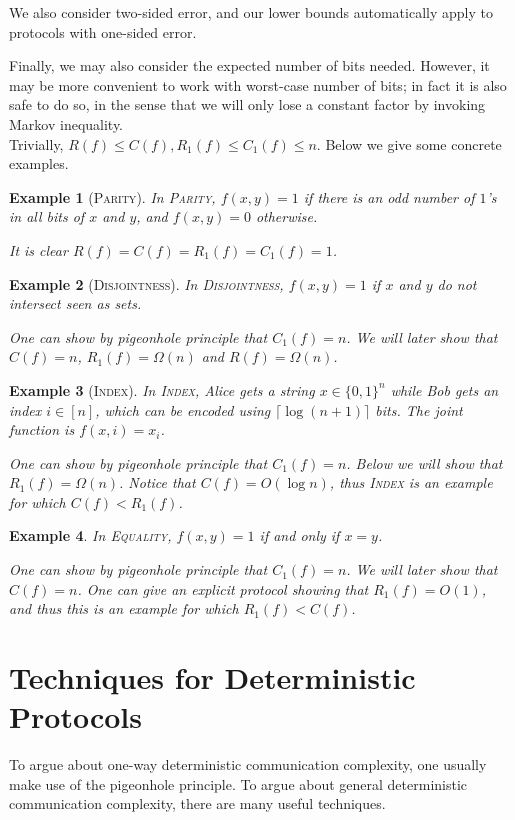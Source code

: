 \documentclass[openany]{book}
\newtheorem{example}{Example}[chapter]
\begin{document}
We also consider two-sided error, and our lower bounds automatically apply to protocols with one-sided error.

Finally, we may also consider the expected number of bits needed. However, it may be more convenient to work with worst-case number of bits; in fact it is also safe to do so, in the sense that we will only lose a constant factor by invoking Markov inequality. \\

Trivially, $R(f)\le C(f),R_1(f)\le C_1(f)\le n$. Below we give some concrete examples.
\begin{example}[\textsc{Parity}]
    In \textsc{Parity}, $f(x,y)=1$ if there is an odd number of $1$'s in all bits of $x$ and $y$, and $f(x,y)=0$ otherwise.

    It is clear $R(f)=C(f)=R_1(f)=C_1(f)=1$.
\end{example}
\begin{example}[\textsc{Disjointness}]
    In \textsc{Disjointness}, $f(x,y)=1$ if $x$ and $y$ do not intersect seen as sets.

    One can show by pigeonhole principle that $C_1(f)=n$. We will later show that $C(f)=n$, $R_1(f)=\Omega(n)$ and $R(f)=\Omega(n)$.
\end{example}
\begin{example}[\textsc{Index}]
    In \textsc{Index}, Alice gets a string $x\in\{0,1\}^n$ while Bob gets an index $i\in[n]$, which can be encoded using $\lceil\log(n+1)\rceil$ bits. The joint function is $f(x,i)=x_i$.

    One can show by pigeonhole principle that $C_1(f)=n$. Below we will show that $R_1(f)=\Omega(n)$. Notice that $C(f)=O(\log n)$, thus \textsc{Index} is an example for which $C(f)<R_1(f)$.
\end{example}
\begin{example}
    In \textsc{Equality}, $f(x,y)=1$ if and only if $x=y$.

    One can show by pigeonhole principle that $C_1(f)=n$. We will later show that $C(f)=n$. One can give an explicit protocol showing that $R_1(f)=O(1)$, and thus this is an example for which $R_1(f)<C(f)$.
\end{example}

\section{Techniques for Deterministic Protocols}
To argue about one-way deterministic communication complexity, one usually make use of the pigeonhole principle. To argue about general deterministic communication complexity, there are many useful techniques.
\end{document}
